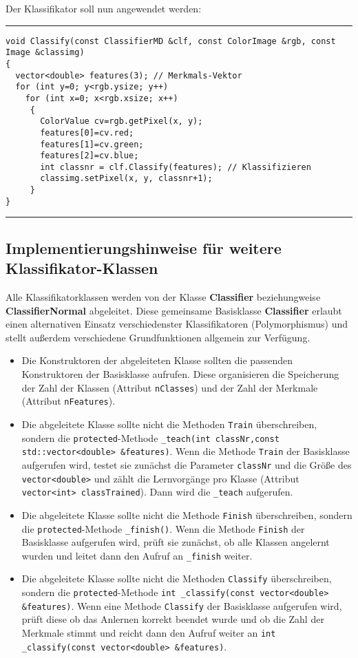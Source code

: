 \documentclass[10pt,titlepage]{article}
\def\bsee#1{#1}
\newcommand{\class}[1]{{\bf \bsee{#1}}}
\def\begprogr{\par\noindent\begin{minipage}{\textwidth}\medskip\hrule\medskip}
\def\endprogr{\nopagebreak\hrule\end{minipage}\par\medskip\noindent}
\begin{document}
{{Der Klassifikator soll nun angewendet werden:
\begprogr\begin{verbatim}
void Classify(const ClassifierMD &clf, const ColorImage &rgb, const Image &classimg)
{
  vector<double> features(3); // Merkmals-Vektor
  for (int y=0; y<rgb.ysize; y++)
    for (int x=0; x<rgb.xsize; x++)
     {
       ColorValue cv=rgb.getPixel(x, y);
       features[0]=cv.red;
       features[1]=cv.green;
       features[2]=cv.blue;
       int classnr = clf.Classify(features); // Klassifizieren
       classimg.setPixel(x, y, classnr+1);
     }
}
\end{verbatim}\endprogr

\subsection{Implementierungshinweise für weitere Klassifikator-Klassen}

Alle Klassifikatorklassen werden von der Klasse \class{Classifier} 
beziehungweise
\class{ClassifierNormal} abgeleitet.
Diese gemeinsame Basisklasse \class{Classifier} erlaubt einen alternativen 
Einsatz verschiedenster Klassifikatoren (Polymorphismus) und stellt 
außerdem verschiedene Grundfunktionen allgemein zur Verfügung.

\begin{itemize}
\item Die Konstruktoren der abgeleiteten Klasse sollten die passenden Konstruktoren der
Basisklasse aufrufen. Diese organisieren die Speicherung der Zahl der Klassen (Attribut \verb+nClasses+)
und der Zahl der Merkmale (Attribut \verb+nFeatures+).
\item Die abgeleitete Klasse sollte nicht die Methoden \verb+Train+ überschreiben, sondern die 
\verb+protected+-Methode \verb+_teach(int classNr,const std::vector<double> &features)+. Wenn die Methode 
\verb+Train+ der Basisklasse aufgerufen wird, testet sie zunächst die Parameter \verb+classNr+ und die Größe des 
\verb+vector<double>+ und zählt die Lernvorgänge pro Klasse (Attribut \verb+vector<int> classTrained+). 
Dann wird die \verb+_teach+ aufgerufen.
\item Die abgeleitete Klasse sollte nicht die Methode \verb+Finish+ überschreiben, sondern die 
\verb+protected+-Methode \verb+_finish()+. Wenn die Methode \verb+Finish+ der Basisklasse aufgerufen wird, 
prüft sie zunächst, ob alle Klassen angelernt wurden und leitet dann den Aufruf an \verb+_finish+ weiter.
\item Die abgeleitete Klasse sollte nicht die Methoden \verb+Classify+ überschreiben, sondern die 
\verb+protected+-Methode \verb+int _classify(const vector<double> &features)+. 
Wenn eine Methode \verb+Classify+ der Basisklasse aufgerufen wird, prüft diese ob das Anlernen korrekt
beendet wurde und ob die Zahl der Merkmale stimmt und reicht dann den Aufruf weiter an  
\verb+int _classify(const vector<double> &features)+. 
\end{itemize}
 
}}
\end{document}
